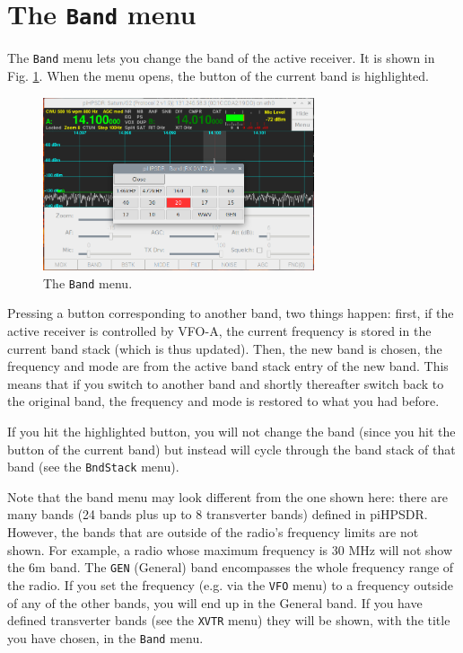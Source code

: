 \documentclass[12pt]{book}
\def\rett#1{\texttt{\color{red}#1}}
\def\bltt#1{\texttt{\color{blue}#1}}
\def\pH{pi\-HPSDR\xspace}
\begin{document}
\section{The \texttt{Band} menu}
\label{sec:bandmenu}
The \bltt{Band} menu lets you change the band of the active receiver. It is shown
in Fig. \ref{fig:BandMenu}. When the menu opens, the button of the current band
is highlighted.

\begin{figure}[ht]
\center
\includegraphics[width=8cm]{BandMenu.png}
\caption{The \bltt{Band} menu.}
\label{fig:BandMenu}
\end{figure}

Pressing a button corresponding to another band, two things happen: first, if the
active receiver is controlled by VFO-A, the current frequency is stored in the current
band stack (which is thus updated). Then, the new band is chosen, the frequency and mode
are from the active band stack entry of the new band. This means that if you switch
to another band and shortly thereafter switch back to the original band, the
frequency and mode is restored to what you had before.

If you hit the highlighted button, you will not change the band (since you hit the
button of the current band) but instead will cycle through the band stack of that band
(see the \bltt{BndStack} menu).


Note that the band menu may look different from the one shown here: there are many bands
(24 bands plus up to 8 transverter bands) defined in \pH. However, the bands that
are outside of the radio's frequency limits are not shown. For example, a radio
whose maximum frequency is 30 MHz will not show the 6m band. The \rett{GEN} (General)
band encompasses the whole frequency range of the radio. If you set the frequency
(e.g. via the \bltt{VFO} menu) to a frequency outside of any of the other bands, you
will end up in the General band. If you have defined transverter bands (see the
\bltt{XVTR} menu) they will be shown, with the title you have chosen, in the
\bltt{Band} menu.
\end{document}
